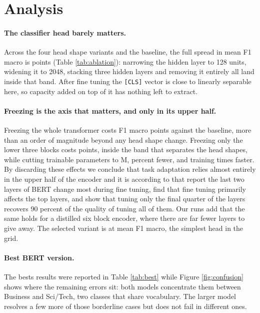 \documentclass{article}
\begin{document}
\section{Analysis}

\paragraph{The classifier head barely matters.}
Across the four head shape variants and the baseline, the full spread in mean F1 macro is \headSpread{}
points (Table \ref{tab:ablation}): narrowing the hidden layer to 128 units,
widening it to 2048, stacking three hidden layers and removing it entirely all land inside that band. After
fine tuning the \texttt{[CLS]} vector is close to linearly separable here, so capacity added on top of it
has nothing left to extract.



\paragraph{Freezing is the axis that matters, and only in its upper half.}
Freezing the whole transformer costs \frozenGap{} F1 macro points against the baseline, more than an order of magnitude beyond any head shape change. Freezing only the lower three blocks costs \halfFrozenGap{} points, inside the band that separates the head shapes, while cutting trainable parameters to \halfFrozenTrainable{}M, \halfFrozenTrainableCut{} percent fewer, and training \halfFrozenSpeedup{} times faster. By discarding these effects we conclude that task adaptation relies almost entirely in the upper half of the encoder and it is according to \citet{kovaleva2019revealing} that report the last two layers of BERT change most during fine tuning, \citet{merchant2020what} find that fine tuning primarily affects the top layers, and \citet{lee2019freezing} show that tuning only the final quarter of the layers recovers 90 percent of the quality of tuning all of them. Our runs add that the same holds for a distilled six block encoder, where there are far fewer layers to give away. The selected variant is \bestVariant{} at \bestVariantFone{} mean F1 macro, the simplest head in the grid.

\paragraph{Best BERT version.}
The bests results were reported in Table \ref{tab:best} while Figure \ref{fig:confusion} shows where the remaining errors sit: both models concentrate them between Business and Sci/Tech, two classes that share vocabulary. The larger model resolves a few more of those borderline cases but does not fail in different ones.
\end{document}
